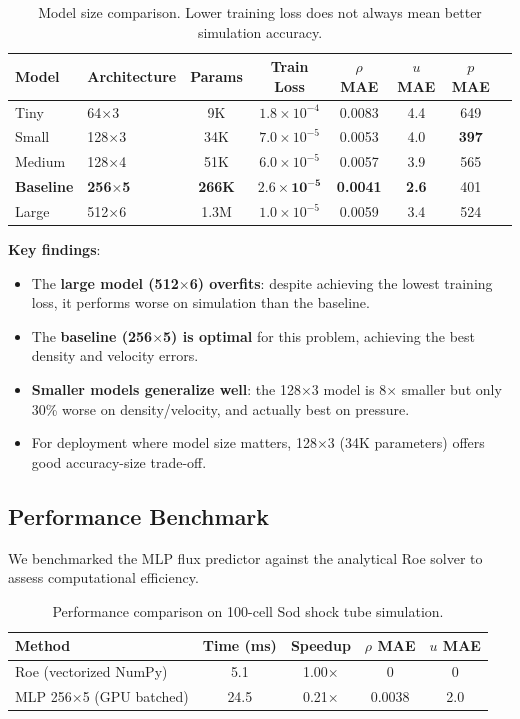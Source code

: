 \documentclass[11pt,a4paper]{article}
\begin{document}
\begin{table}[H]
\centering
\begin{tabular}{llcccccc}
\toprule
Model & Architecture & Params & Train Loss & $\rho$ MAE & $u$ MAE & $p$ MAE \\
\midrule
Tiny & 64$\times$3 & 9K & $1.8 \times 10^{-4}$ & 0.0083 & 4.4 & 649 \\
Small & 128$\times$3 & 34K & $7.0 \times 10^{-5}$ & 0.0053 & 4.0 & \textbf{397} \\
Medium & 128$\times$4 & 51K & $6.0 \times 10^{-5}$ & 0.0057 & 3.9 & 565 \\
\textbf{Baseline} & \textbf{256$\times$5} & \textbf{266K} & $\mathbf{2.6 \times 10^{-5}}$ & \textbf{0.0041} & \textbf{2.6} & 401 \\
Large & 512$\times$6 & 1.3M & $1.0 \times 10^{-5}$ & 0.0059 & 3.4 & 524 \\
\bottomrule
\end{tabular}
\caption{Model size comparison. Lower training loss does not always mean better simulation accuracy.}
\label{tab:model_size}
\end{table}

\textbf{Key findings}:
\begin{itemize}
    \item The \textbf{large model (512$\times$6) overfits}: despite achieving the lowest training loss, it performs worse on simulation than the baseline.
    \item The \textbf{baseline (256$\times$5) is optimal} for this problem, achieving the best density and velocity errors.
    \item \textbf{Smaller models generalize well}: the 128$\times$3 model is 8$\times$ smaller but only 30\% worse on density/velocity, and actually best on pressure.
    \item For deployment where model size matters, 128$\times$3 (34K parameters) offers good accuracy-size trade-off.
\end{itemize}

\subsection{Performance Benchmark}

We benchmarked the MLP flux predictor against the analytical Roe solver to assess computational efficiency.

\begin{table}[H]
\centering
\begin{tabular}{lcccc}
\toprule
Method & Time (ms) & Speedup & $\rho$ MAE & $u$ MAE \\
\midrule
Roe (vectorized NumPy) & 5.1 & 1.00$\times$ & 0 & 0 \\
MLP 256$\times$5 (GPU batched) & 24.5 & 0.21$\times$ & 0.0038 & 2.0 \\
\bottomrule
\end{tabular}
\caption{Performance comparison on 100-cell Sod shock tube simulation.}
\label{tab:benchmark}
\end{table}
\end{document}
